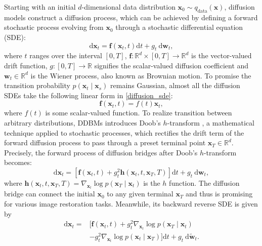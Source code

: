 Starting with an initial $d$-dimensional data distribution $\mathbf{x}_0 \sim q_{\text{data}}(\mathbf{x})$, diffusion models \cite{song2021scorebasedgenerativemodelingstochastic, ho2020denoisingdiffusionprobabilisticmodels, sohldickstein2015deepunsupervisedlearningusing, song2020generativemodelingestimatinggradients} construct a diffusion process, which can be achieved by defining a forward stochastic process evolving from $\mathbf{x}_0$ through a stochastic differential equation (SDE):
\begin{equation}\label{diffusion_sde}
\mathrm{d} \mathbf{x}_t = \mathbf{f}(\mathbf{x}_t, t) \mathrm{d} t+g_t \mathrm{~d} \mathbf{w}_t,
\end{equation}
where $t$ ranges over the interval $[0, T]$, $\mathbf{f}: \mathbb{R}^d \times [0, T] \rightarrow \mathbb{R}^d$ is the vector-valued drift function, $g:[0, T] \rightarrow \mathbb{R}$ signifies the scalar-valued diffusion coefficient and $\mathbf{w}_t \in \mathbb{R}^d$ is the Wiener process, also known as Brownian motion. To promise the transition probability $p(\mathbf{x}_t \mid \mathbf{x}_s)$ remains Gaussian, almost all the diffusion SDEs take the following linear form \cite{zheng2024diffusionbridgeimplicitmodels} in \eqref{diffusion_sde}:
\begin{equation}\label{linear_form}
\mathbf{f}(\mathbf{x}_t, t) = f(t) \mathbf{x}_t,
\end{equation}
where $f(t)$ is some scalar-valued function. To realize transition between arbitrary distributions, DDBMs introduces Doob’s $h$-transform \cite{särkkä2019applied}, a mathematical technique applied to stochastic processes, which rectifies the drift term of the forward diffusion process to pass through a preset terminal point $\mathbf{x}_T \in \mathbb{R}^d$. Precisely, the forward process of diffusion bridges after Doob's $h$-transform becomes: 
\begin{equation}\label{doob}
\mathrm{d} \mathbf{x}_t = \left[ \mathbf{f}(\mathbf{x}_t, t) + g^2_t \mathbf{h}(\mathbf{x}_t, t, \mathbf{x}_T, T) \right] \mathrm{d} t+g_t \mathrm{~d} \mathbf{w}_t,
\end{equation}
where $\mathbf{h}(\mathbf{x}_t, t, \mathbf{x}_T, T) = \nabla_{\mathbf{x}_t} \log p(\mathbf{x}_T \mid \mathbf{x}_t)$ is the $h$ function. The diffusion bridge can connect the initial $\mathbf{x}_0$ to any given terminal $\mathbf{x}_T$ and thus is promising for various image restoration tasks. Meanwhile, its backward reverse SDE \cite{ANDERSON1982313} is given by
\begin{equation}\label{reverse-bridge-sde}
\begin{aligned}
\mathrm{d} \mathbf{x}_t = & \Big[ \mathbf{f}(\mathbf{x}_t, t) + g^2_t \nabla_{\mathbf{x}_t} \log p(\mathbf{x}_T \mid \mathbf{x}_t) \\
& - g_t^2\nabla_{\mathbf{x}_t} \log p(\mathbf{x}_t \mid \mathbf{x}_T) \Big] \mathrm{d} t+g_t \mathrm{~d} \tilde{\mathbf{w}}_t.
\end{aligned}
\end{equation}
